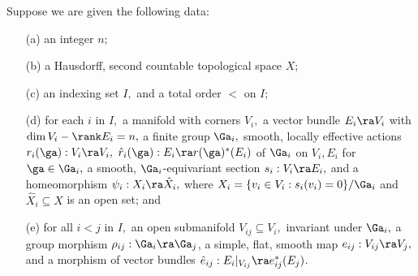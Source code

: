 \documentclass{article}
\begin{document}
\begin{thm} Suppose we are given the following data:
\begin{itemize}
\setlength{\itemsep}{0pt}
\setlength{\parsep}{0pt}
\item[{\rm(a)}] an integer $n;$
\item[{\rm(b)}] a Hausdorff, second countable topological space $X;$
\item[{\rm(c)}] an indexing set\/ $I,$ and a total order $<$ on $I;$
\item[{\rm(d)}] for each\/ $i$ in $I,$ a manifold with corners\/
$V_i,$ a vector bundle $E_i\ra V_i$ with\/ $\dim V_i-\rank
E_i=n,$ a finite group\/ $\Ga_i,$ smooth, locally effective
actions\/ $r_i(\ga):V_i\ra V_i,$ $\hat r_i(\ga):E_i\ra
r(\ga)^*(E_i)$ of\/ $\Ga_i$ on $V_i,E_i$ for $\ga\in\Ga_i,$ a
smooth, $\Ga_i$-equivariant section $s_i:V_i\ra E_i,$ and a
homeomorphism $\psi_i:X_i\ra\hat X_i,$ where $X_i=\{v_i\in
V_i:s_i(v_i)=0\}/\Ga_i$ and\/ $\hat X_i\subseteq X$ is an open
set; and
\item[{\rm(e)}] for all\/ $i<j$ in $I,$ an open submanifold\/
$V_{ij}\subseteq V_i,$ invariant under $\Ga_i,$ a group morphism
$\rho_{ij}:\Ga_i\ra\Ga_j$, a simple, flat, smooth map
$e_{ij}:V_{ij}\ra V_j,$ and a morphism of vector bundles $\hat
e_{ij}:E_i\vert_{V_{ij}}\ra e_{ij}^*(E_j)$.
\end{itemize}


\end{thm}
\end{document}
